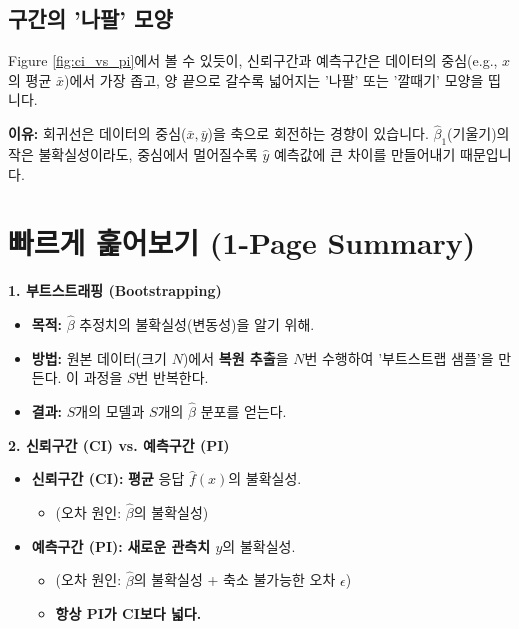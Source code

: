 \documentclass[11pt,a4paper]{book}
\theoremstyle{definition}
\begin{document}
\subsection{구간의 '나팔' 모양}

Figure \ref{fig:ci_vs_pi}에서 볼 수 있듯이, 신뢰구간과 예측구간은 데이터의 중심(e.g., $x$의 평균 $\bar{x}$)에서 가장 좁고, 양 끝으로 갈수록 넓어지는 '나팔' 또는 '깔때기' 모양을 띱니다.

\textbf{이유:} 회귀선은 데이터의 중심($\bar{x}, \bar{y}$)을 축으로 회전하는 경향이 있습니다. $\hat{\beta}_1$(기울기)의 작은 불확실성이라도, 중심에서 멀어질수록 $\hat{y}$ 예측값에 큰 차이를 만들어내기 때문입니다.


\section{빠르게 훑어보기 (1-Page Summary)}

\begin{summarybox}
\textbf{1. 부트스트래핑 (Bootstrapping)}
\begin{itemize}
    \item \textbf{목적:} $\hat{\beta}$ 추정치의 불확실성(변동성)을 알기 위해.
    \item \textbf{방법:} 원본 데이터(크기 $N$)에서 \textbf{복원 추출}을 $N$번 수행하여 '부트스트랩 샘플'을 만든다. 이 과정을 $S$번 반복한다.
    \item \textbf{결과:} $S$개의 모델과 $S$개의 $\hat{\beta}$ 분포를 얻는다.
\end{itemize}
\end{summarybox}

\begin{infobox}
\textbf{2. 신뢰구간 (CI) vs. 예측구간 (PI)}
\begin{itemize}
    \item \textbf{신뢰구간 (CI):} \textbf{평균} 응답 $\hat{f}(x)$의 불확실성.
        \begin{itemize}
            \item (오차 원인: $\hat{\beta}$의 불확실성)
        \end{itemize}
    \item \textbf{예측구간 (PI):} \textbf{새로운 관측치 $y$}의 불확실성.
        \begin{itemize}
            \item (오차 원인: $\hat{\beta}$의 불확실성 + 축소 불가능한 오차 $\epsilon$)
            \item \textbf{항상 PI가 CI보다 넓다.}
        \end{itemize}
\end{itemize}
\end{infobox}
\end{document}
